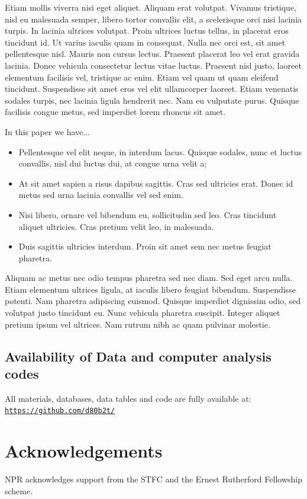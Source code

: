\documentclass[a4paper,fleqn,usenatbib]{mnras}
\begin{document}
Etiam mollis viverra nisi eget aliquet. Aliquam erat volutpat. Vivamus
tristique, nisl eu malesuada semper, libero tortor convallis elit, a
scelerisque orci nisi lacinia turpis. In lacinia ultrices
volutpat. Proin ultrices luctus tellus, in placerat eros tincidunt
id. Ut varius iaculis quam in consequat. Nulla nec orci est, sit amet
pellentesque nisl. Mauris non cursus lectus. Praesent placerat leo vel
erat gravida lacinia. Donec vehicula consectetur lectus vitae
luctus. Praesent nisl justo, laoreet elementum facilisis vel,
tristique ac enim. Etiam vel quam ut quam eleifend
tincidunt. Suspendisse sit amet eros vel elit ullamcorper
laoreet. Etiam venenatis sodales turpis, nec lacinia ligula hendrerit
nec. Nam eu vulputate purus. Quisque facilisis congue metus, sed
imperdiet lorem rhoncus sit amet.

In this paper we have... 
\begin{itemize}
\item Pellentesque vel elit neque, in interdum lacus. Quisque sodales, nunc et luctus convallis, nisl dui luctus dui, at congue urna velit a; 
\item At sit amet sapien a risus dapibus sagittis. Cras sed ultricies erat. Donec id metus sed urna lacinia convallis vel sed enim. 
\item Nisi libero, ornare vel bibendum eu, sollicitudin sed leo. Cras tincidunt aliquet ultricies. Cras pretium velit leo, in malesuada. 
\item Duis sagittis ultricies interdum. Proin sit amet sem nec metus feugiat pharetra.
\end{itemize}

Aliquam ac metus nec odio tempus pharetra sed nec diam. Sed eget arcu
nulla. Etiam elementum ultrices ligula, at iaculis libero feugiat
bibendum. Suspendisse potenti. Nam pharetra adipiscing
euismod. Quisque imperdiet dignissim odio, sed volutpat justo
tincidunt eu. Nunc vehicula pharetra suscipit. Integer aliquet pretium
ipsum vel ultrices. Nam rutrum nibh ac quam pulvinar molestie.



\subsection*{Availability of Data and computer analysis codes} 
All materials, databases, data tables and code are fully available at: 
\href{https://github.com/d80b2t/VHzQ}{\tt https://github.com/d80b2t/}


\section*{Acknowledgements}
NPR acknowledges support from the STFC and the Ernest Rutherford Fellowship scheme. 
\end{document}
